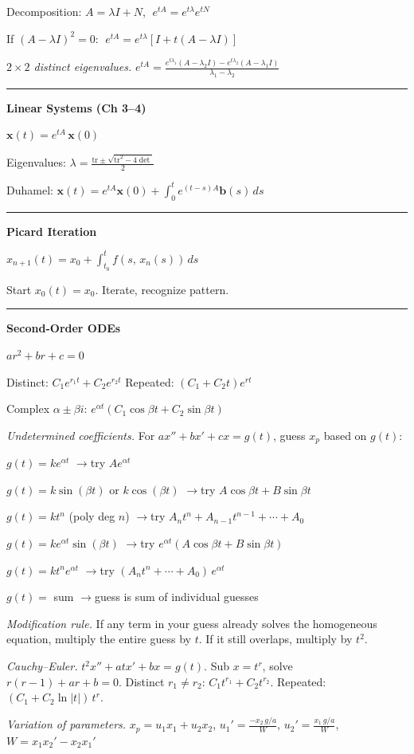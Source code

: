 \documentclass[10pt]{article}
\newcommand{\heading}[1]{\bigskip\hrule\vspace{5pt}\textbf{#1}\vspace{8pt}\par}
\newcommand{\sub}[1]{\bigskip\textit{#1.}\;}
\newlength{\colw}
\begin{document}
\begin{minipage}[t]{\colw}
  Decomposition: $A=\lambda I+N$, $\;e^{tA}=e^{t\lambda}e^{tN}$

  If $(A-\lambda I)^2=0$: $\;e^{tA}=e^{t\lambda}[I+t(A-\lambda I)]$

  \sub{$2\times2$ distinct eigenvalues}
  $e^{tA} = \frac{e^{t\lambda_1}(A-\lambda_2 I) - e^{t\lambda_2}(A-\lambda_1 I)}{\lambda_1-\lambda_2}$

  \heading{Linear Systems (Ch 3--4)}

  $\mathbf{x}(t)=e^{tA}\,\mathbf{x}(0)$

  Eigenvalues: $\lambda=\frac{\text{tr}\pm\sqrt{\text{tr}^2-4\det}}{2}$

  Duhamel: $\mathbf{x}(t) = e^{tA}\mathbf{x}(0)+\int_0^t e^{(t-s)A}\mathbf{b}(s)\,ds$

  \heading{Picard Iteration}

  $x_{n+1}(t) = x_0 + \int_{t_0}^t f(s,\,x_n(s))\,ds$

  Start $x_0(t)=x_0$. Iterate, recognize pattern.

\end{minipage}\hfill\vrule\hfill
\begin{minipage}[t]{\colw}

  \heading{Second-Order ODEs}

  $ar^2+br+c=0$

  Distinct: $C_1e^{r_1t}+C_2e^{r_2t}$ \quad Repeated: $(C_1+C_2t)e^{rt}$

  Complex $\alpha\pm\beta i$: $e^{\alpha t}(C_1\cos\beta t+C_2\sin\beta t)$

  \sub{Undetermined coefficients} For $ax''+bx'+cx=g(t)$, guess $x_p$ based on $g(t)$:

  $g(t)=ke^{\alpha t}$ \quad$\to$\quad try $Ae^{\alpha t}$

  $g(t)=k\sin(\beta t)$ or $k\cos(\beta t)$ \quad$\to$\quad try $A\cos\beta t+B\sin\beta t$

  $g(t)=kt^n$ (poly deg $n$) \quad$\to$\quad try $A_nt^n+A_{n-1}t^{n-1}+\cdots+A_0$

  $g(t)=ke^{\alpha t}\sin(\beta t)$ \quad$\to$\quad try $e^{\alpha t}(A\cos\beta t+B\sin\beta t)$

  $g(t)=kt^n e^{\alpha t}$ \quad$\to$\quad try $(A_nt^n+\cdots+A_0)\,e^{\alpha t}$

  $g(t)=$ sum \quad$\to$\quad guess is sum of individual guesses

  \sub{Modification rule} If any term in your guess already solves the homogeneous equation, multiply the entire guess by $t$. If it still overlaps, multiply by $t^2$.

  \sub{Cauchy--Euler} $t^2x''+atx'+bx=g(t)$. Sub $x=t^r$, solve $r(r-1)+ar+b=0$. Distinct $r_1\ne r_2$: $C_1t^{r_1}+C_2t^{r_2}$. Repeated: $(C_1+C_2\ln|t|)\,t^r$.

  \sub{Variation of parameters} $x_p=u_1x_1+u_2x_2$, \;\; $u_1'=\frac{-x_2\,g/a}{W}$, \;\; $u_2'=\frac{x_1\,g/a}{W}$, \;\; $W=x_1x_2'-x_2x_1'$

\end{minipage}
\end{document}
